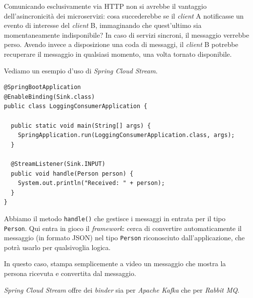 Comunicando esclusivamente via HTTP non si avrebbe il vantaggio dell'asincronicità dei microservizi: cosa succederebbe se il \textit{client} A notificasse un evento di interesse del \textit{client} B, immaginando che quest'ultimo sia momentaneamente indisponibile?
In caso di servizi sincroni, il messaggio verrebbe perso. Avendo invece a disposizione una coda di messaggi, il \textit{client} B potrebbe recuperare il messaggio in qualsiasi momento, una volta tornato disponibile.

Vediamo un esempio d'uso di \textit{Spring Cloud Stream}.
\begin{tcolorbox}
	\begin{lstlisting}
@SpringBootApplication
@EnableBinding(Sink.class)
public class LoggingConsumerApplication {

  public static void main(String[] args) {
    SpringApplication.run(LoggingConsumerApplication.class, args);
  }

  @StreamListener(Sink.INPUT)
  public void handle(Person person) {
    System.out.println("Received: " + person);
  }
}
	\end{lstlisting}
\end{tcolorbox}

Abbiamo il metodo \texttt{handle()} che gestisce i messaggi in entrata per il tipo \texttt{Person}.
Qui entra in gioco il \textit{framework}: cerca di convertire automaticamente il messaggio (in formato JSON) nel tipo \texttt{Person} riconosciuto dall'applicazione, che potrà usarlo per qualsivoglia logica.

In questo caso, stampa semplicemente a video un messaggio che mostra la persona ricevuta e convertita dal messaggio.

\bigskip

\textit{Spring Cloud Stream} offre dei \textit{binder} sia per \textit{Apache Kafka} che per \textit{Rabbit MQ}.